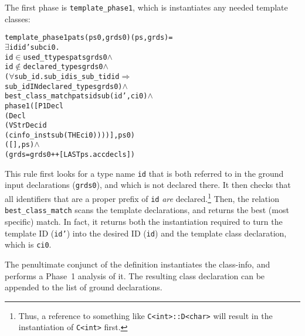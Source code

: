 \documentclass[11pt]{article}
\begin{document}
The first phase is \texttt{template_phase1}, which is instantiates any
needed template classes:
\begin{center}
\begin{minipage}{\textwidth}
\begin{alltt}
   template_phase1 pats (ps0, grds0) (ps, grds) =
     \(\exists\)id id' sub ci0.
       id \(\in\) used_ttypes pats grds0 \(\land\)
       id \(\not\in\) declared_types grds0 \(\land\)
       (\(\forall\)sub_id. sub_id is_sub_tid id \(\Rightarrow\)
                 sub_id IN declared_types grds0) \(\land\)
       best_class_match pats id sub (id', ci0) \(\land\)
       phase1 ([P1Decl
                  (Decl
                     (VStrDec id
                        (cinfo_inst sub (THE ci0))))], ps0)
              ([], ps) \(\land\)
       (grds = grds0 ++ [LAST ps.accdecls])
\end{alltt}
\end{minipage}
\end{center}
This rule first looks for a type name \texttt{id} that is both
referred to in the ground input declarations (\texttt{grds0}), and
which is not declared there.  It then checks that all identifiers that
are a proper prefix of \texttt{id} \emph{are} declared.\footnote{Thus,
  a reference to something like \texttt{C<int>::D<char>} will result
  in the instantiation of \texttt{C<int>} first.} Then, the relation
\texttt{best_class_match} scans the template declarations, and returns
the best (most specific) match.  In fact, it returns both the
instantiation required to turn the template ID (\texttt{id'}) into the
desired ID (\texttt{id}) and the template class declaration, which is
\texttt{ci0}.

The penultimate conjunct of the definition instantiates the
class-info, and performs a Phase~1 analysis of it.  The resulting
class declaration can be appended to the list of ground declarations.
\end{document}
